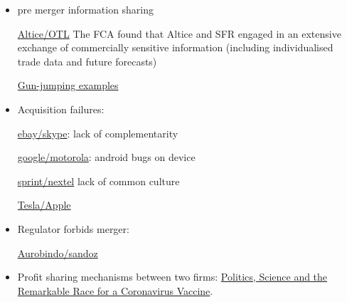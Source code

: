 \documentclass[a4paper,leqno]{article}%
\begin{document}
\begin{itemize}
    \item pre merger information sharing
    
    \href{https://sites-herbertsmithfreehills.vuturevx.com/46/12874/compose-email/the-altice-case--a-costly-warning-not-to-engage-in-gun-jumping-before-receiving-merger-control-clearance.asp}{Altice/OTL} The FCA found that Altice and SFR engaged in an extensive exchange of commercially sensitive information (including individualised trade data and future forecasts)
    
    \href{https://www.twobirds.com/en/news/articles/2020/global/double-caution-gun-jumping-risks-in-m-and-a-transactions}{Gun-jumping examples}
    \item Acquisition failures:
    
    \href{https://www.investopedia.com/articles/insights/061816/4-cases-when-ma-strategy-failed-acquirer-ebay-bac.asp}{ebay/skype}: lack of complementarity
    
    \href{https://salessynergy.net/the-biggest-acquisition-disasters-that-put-companies-into-quite-a-bit-of-trouble/}{google/motorola}: android bugs on device
    
    \href{https://www.investopedia.com/articles/financial-theory/08/merger-acquisition-disasters.asp#:~:text=The\%20consolidation\%20of\%20AOL\%20Time,combination\%20up\%20until\%20that\%20time}{sprint/nextel} lack of common culture
    
    \href{https://www.theguardian.com/technology/2020/dec/23/elon-musk-i-tried-to-sell-tesla-to-apple?CMP=Share_iOSApp_Other}{Tesla/Apple}

    
    \item Regulator forbids merger:
    
    \href{https://www.livemint.com/companies/news/aurobindo-pharma-calls-off-1-billion-deal-with-sandoz-after-failing-to-get-ftc-nod-11585801128011.html}{Aurobindo/sandoz}
    
    \item Profit sharing mechanisms between two firms: \href{https://www.nytimes.com/2020/11/21/us/politics/coronavirus-vaccine.html?referringSource=articleShare}{Politics, Science and the Remarkable Race for a Coronavirus Vaccine}.
\end{itemize}
\end{document}
